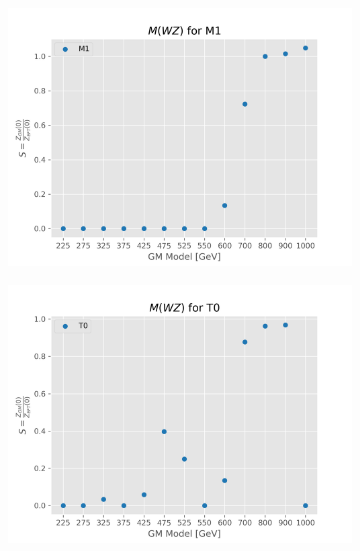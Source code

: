 \documentclass[../Bachelorarbeit.tex]{subfiles}
\begin{document}
\begin{figure}[h]
\begin{subfigure}{0.45\textwidth}
    \end{subfigure}
    \begin{subfigure}{0.45\textwidth}
        \includegraphics[width=\textwidth]{Plots/gm_relevanze/MWZ_op_M1.png}

    \end{subfigure}
    \begin{subfigure}{0.45\textwidth}
        \includegraphics[width=\textwidth]{Plots/gm_relevanze/MWZ_op_T0.png}


\end{subfigure}
\end{figure}
\end{document}
